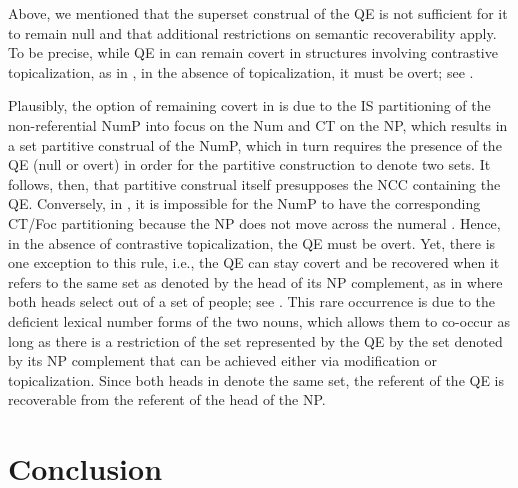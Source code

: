 \documentclass[output=paper,
modfonts,
newtxmath,
hidelinks
]{langscibook}
\begin{document}
Above, we mentioned that the superset construal of the QE is not sufficient for it to remain null and that additional restrictions on semantic recoverability apply. To be precise, while QE in  can remain covert in structures involving contrastive topicalization, as in , in the absence of topicalization, it must be overt; see . 
\ea \label{18:ex34}
	\z
    
\z 

\noindent Plausibly, the option of remaining covert in  is due to the IS partitioning of the non-referential NumP into focus on the Num and CT on the NP, which results in a set partitive construal of the NumP, which in turn requires the presence of the QE (null or overt) in order for the partitive construction to denote two sets. It follows, then, that partitive construal itself presupposes the NCC containing the QE. Conversely, in , it is impossible for the NumP to have the corresponding CT/Foc partitioning because the NP does not move across the numeral \citep{Titov2013}. Hence, in the absence of contrastive topicalization, the QE must be overt. Yet, there is one exception to this rule, i.e., the QE can stay covert and be recovered when it refers to the same set as denoted by the head of its NP\textsubscript{} complement, as in  where both heads select out of a set of people; see . This rare occurrence is due to the deficient lexical number forms of the two nouns, which allows them to co-occur as long as there is a restriction of the set represented by the QE by the set denoted by its NP complement that can be achieved either via modification or topicalization. Since both heads in  denote the same set, the referent of the QE is recoverable from the referent of the head of the NP.\textsubscript{} 

\section{Conclusion}\label{18:s5}
\end{document}
